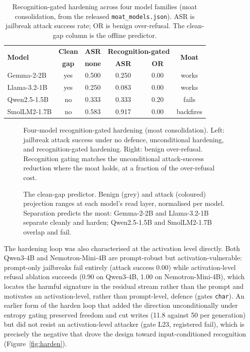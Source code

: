 \begin{table}[t]
\caption{Recognition-gated hardening across four model families (moat consolidation, from the released \texttt{moat\_models.json}). ASR is jailbreak attack success rate; OR is benign over-refusal. The clean-gap column is the offline predictor.}
\label{tab:moat}
\vskip 0.1in
\centering
{\footnotesize
\begin{tabular}{lccccc}
\toprule
\multirow{2}{*}{\textbf{Model}} & \textbf{Clean} & \textbf{ASR} & \multicolumn{2}{c}{\textbf{Recognition-gated}} & \multirow{2}{*}{\textbf{Moat}} \\
 & \textbf{gap} & \textbf{none} & \textbf{ASR} & \textbf{OR} & \\
\midrule
Gemma-2-2B    & yes & 0.500 & 0.250 & 0.00 & works \\
Llama-3.2-1B  & yes & 0.250 & 0.083 & 0.00 & works \\
Qwen2.5-1.5B  & no  & 0.333 & 0.333 & 0.20 & fails \\
SmolLM2-1.7B  & no  & 0.583 & 0.917 & 0.00 & backfires \\
\bottomrule
\end{tabular}}
\end{table}

\begin{figure}[t]
\centering
\resizebox{\columnwidth}{!}{}
\caption{Four-model recognition-gated hardening (moat consolidation). Left: jailbreak attack success under no defence, unconditional hardening, and recognition-gated hardening. Right: benign over-refusal. Recognition gating matches the unconditional attack-success reduction where the moat holds, at a fraction of the over-refusal cost.}
\label{fig:moat}
\end{figure}

\begin{figure}[t]
\centering
\resizebox{\columnwidth}{!}{}
\caption{The clean-gap predictor. Benign (grey) and attack (coloured) projection ranges at each model's read layer, normalised per model. Separation predicts the moat: Gemma-2-2B and Llama-3.2-1B separate cleanly and harden; Qwen2.5-1.5B and SmolLM2-1.7B overlap and fail.}
\label{fig:cleangap}
\end{figure}

The hardening loop was also characterised at the activation level directly. Both Qwen3-4B and Nemotron-Mini-4B are prompt-robust but activation-vulnerable: prompt-only jailbreaks fail entirely (attack success 0.00) while activation-level refusal ablation succeeds (0.90 on Qwen3-4B, 1.00 on Nemotron-Mini-4B), which locates the harmful signature in the residual stream rather than the prompt and motivates an activation-level, rather than prompt-level, defence (gates \texttt{char}). An earlier form of the harden loop that added the direction unconditionally under entropy gating preserved freedom and cut writes (11.8 against 50 per generation) but did not resist an activation-level attacker (gate L23, registered fail), which is precisely the negative that drove the design toward input-conditioned recognition (Figure~\ref{fig:harden}).

